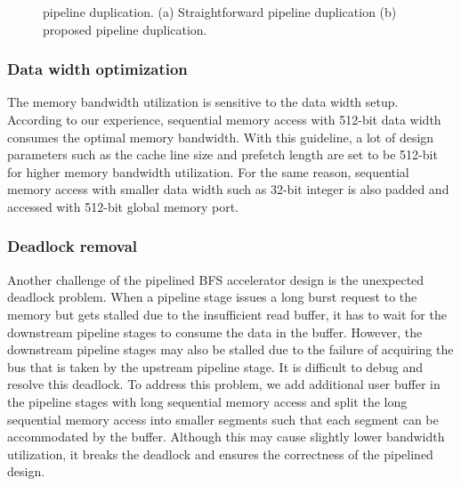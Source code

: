 \begin{figure}
    \caption{pipeline duplication. (a) Straightforward pipeline duplication 
    (b) proposed pipeline duplication.}
\label{fig:duplicate-pipeline}
\end{figure}


\subsubsection{Data width optimization}
The memory bandwidth utilization is sensitive to the data width setup. 
According to our experience, sequential memory access 
with 512-bit data width consumes the optimal memory bandwidth. With this guideline, 
a lot of design parameters such as the cache line size and prefetch length are 
set to be 512-bit for higher memory bandwidth utilization. For the same reason, sequential 
memory access with smaller data width such as 32-bit integer is also 
padded and accessed with 512-bit global memory port.


\subsubsection{Deadlock removal}
Another challenge of the pipelined BFS accelerator design is the 
unexpected deadlock problem. 
When a pipeline stage issues a long burst request to the memory 
but gets stalled due to the insufficient read buffer, it has to 
wait for the downstream pipeline stages to consume the data in the buffer. 
However, the downstream pipeline stages may also be stalled due to 
the failure of acquiring the bus that is taken by the upstream pipeline stage.
It is difficult to debug and resolve this deadlock. To address this problem, we
add additional user buffer in the pipeline stages with long sequential 
memory access and split the long sequential memory access into smaller 
segments such that each segment can be accommodated by the buffer. 
Although this may cause slightly lower bandwidth utilization, it breaks the deadlock and 
ensures the correctness of the pipelined design.

